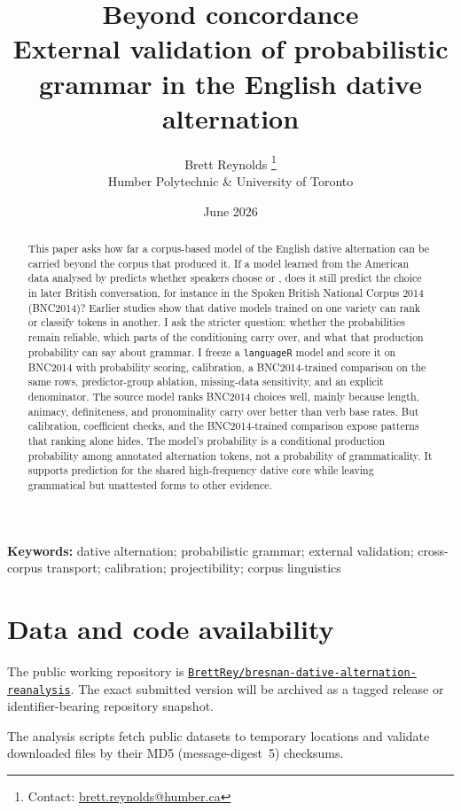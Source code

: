 \documentclass[12pt]{article}
\title{Beyond concordance\\
{\large External validation of probabilistic grammar in the English dative alternation}}
\author{}
\author{Brett Reynolds \orcidlink{0000-0003-0073-7195}%
  \thanks{Contact: \href{mailto:brett.reynolds@humber.ca}{brett.reynolds@humber.ca}}\\
  Humber Polytechnic \& University of Toronto}
\date{June 2026}
\newif\ifblind
\begin{document}
\maketitle

\begin{abstract}
This paper asks how far a corpus-based model of the English dative alternation
can be carried beyond the corpus that produced it. If a model learned from
the American data analysed by \textcite{bresnan2007} predicts whether speakers
choose  or , does it
still predict the choice in later British conversation, for instance in the Spoken British
National Corpus 2014 (BNC2014)? Earlier studies show that dative models trained on one variety
can rank or classify tokens in another. I ask the stricter question: whether the
probabilities remain reliable, which parts of the conditioning carry over, and
what that production probability can say about grammar. I freeze a
\texttt{languageR} model and score it on BNC2014 with probability scoring,
calibration, a BNC2014-trained comparison on the same rows, predictor-group
ablation, missing-data sensitivity, and an explicit denominator. The source
model ranks BNC2014 choices well, mainly because length, animacy, definiteness,
and pronominality carry over better than verb base rates. But calibration,
coefficient checks, and the BNC2014-trained comparison expose patterns that
ranking alone hides. The model's probability is a conditional production
probability among annotated alternation tokens, not a probability of
grammaticality. It supports prediction for the shared high-frequency dative core
while leaving grammatical but unattested forms to other evidence.
\end{abstract}

\noindent\textbf{Keywords:} dative alternation; probabilistic grammar; external validation; cross-corpus transport; calibration; projectibility; corpus linguistics









\section*{Data and code availability}

\ifblind
The analysis code and derived files are in a public repository, withheld here
for double-blind review and available to the editors on request; a
de-anonymized link will accompany the camera-ready version.
\else
The public working repository is
\href{https://github.com/BrettRey/bresnan-dative-alternation-reanalysis}{\texttt{BrettRey/bresnan-dative-alternation-reanalysis}}.
The exact submitted version will be archived as a tagged release or
identifier-bearing repository snapshot.
\fi
The analysis scripts fetch public datasets to temporary locations
and validate downloaded files by their MD5 (message-digest~5) checksums.
\end{document}

